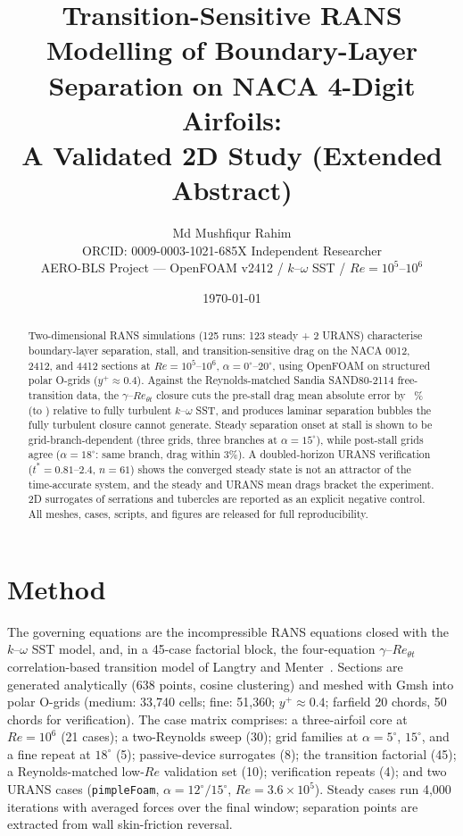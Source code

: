 \documentclass[10pt,a4paper]{article}
\title{\textbf{Transition-Sensitive RANS Modelling of Boundary-Layer Separation on NACA 4-Digit Airfoils:\\ A Validated 2D Study (Extended Abstract)}}
\author{Md Mushfiqur Rahim\\
  \small ORCID: 0009-0003-1021-685X \quad Independent Researcher\\
  \small AERO-BLS Project --- OpenFOAM v2412 / $k$--$\omega$ SST / $Re=10^5$--$10^6$}
\date{\today}
\begin{document}
\maketitle
\vspace{-1.6em}

\begin{abstract}
\noindent Two-dimensional RANS simulations (125 runs: 123 steady + 2 URANS) characterise boundary-layer separation, stall, and transition-sensitive drag on the NACA 0012, 2412, and 4412 sections at $Re = 10^5$--$10^6$, $\alpha = 0^\circ$--$20^\circ$, using OpenFOAM on structured polar O-grids ($y^+ \approx 0.4$). Against the Reynolds-matched Sandia SAND80-2114 free-transition data, the $\gamma$--$Re_{\theta t}$ closure cuts the pre-stall drag mean absolute error by \SandiaCdErrDropPct{}~\% (to \SandiaCdMaeTR) relative to fully turbulent $k$--$\omega$ SST, and produces laminar separation bubbles the fully turbulent closure cannot generate. Steady separation onset at stall is shown to be grid-branch-dependent (three grids, three branches at $\alpha = 15^\circ$), while post-stall grids agree ($\alpha = 18^\circ$: same branch, drag within 3\%). A doubled-horizon URANS verification ($t^* = 0.81$--$2.4$, $n = 61$) shows the converged steady state is not an attractor of the time-accurate system, and the steady and URANS mean drags bracket the experiment. 2D surrogates of serrations and tubercles are reported as an explicit negative control. All meshes, cases, scripts, and figures are released for full reproducibility.
\end{abstract}

\section{Method}
\vspace{-0.4em}
The governing equations are the incompressible RANS equations closed with the $k$--$\omega$ SST model, and, in a 45-case factorial block, the four-equation $\gamma$--$Re_{\theta t}$ correlation-based transition model of Langtry and Menter~\cite{langtry2009}. Sections are generated analytically (638 points, cosine clustering) and meshed with Gmsh into polar O-grids (medium: 33{,}740 cells; fine: 51{,}360; $y^+ \approx 0.4$; farfield 20 chords, 50 chords for verification). The case matrix comprises: a three-airfoil core at $Re = 10^6$ (21 cases); a two-Reynolds sweep (30); grid families at $\alpha = 5^\circ$, $15^\circ$, and a fine repeat at $18^\circ$ (5); passive-device surrogates (8); the transition factorial (45); a Reynolds-matched low-$Re$ validation set (10); verification repeats (4); and two URANS cases (\texttt{pimpleFoam}, $\alpha = 12^\circ/15^\circ$, $Re = 3.6\times10^5$). Steady cases run 4{,}000 iterations with averaged forces over the final window; separation points are extracted from wall skin-friction reversal.
\end{document}
